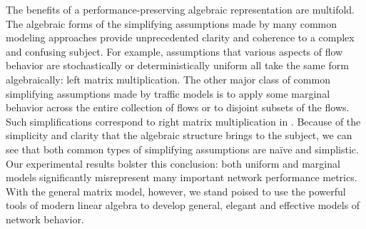 \documentclass[twocolumn,final]{svjour3}
\begin{document}
The benefits of a performance-preserving algebraic representation are multifold. The algebraic forms of the simplifying assumptions made by many common modeling approaches provide unprecedented clarity and coherence to a complex and confusing subject. For example, assumptions that various aspects of flow behavior are stochastically or deterministically uniform all take the same form algebraically: left matrix multiplication. The other major class of common simplifying assumptions made by traffic models is to apply some marginal behavior across the entire collection of flows or to disjoint subsets of the flows. Such simplifications correspond to right matrix multiplication in . Because of the simplicity and clarity that the algebraic structure brings to the subject, we can see that both common types of simplifying assumptions are na\"ive and simplistic. Our experimental results bolster this conclusion: both uniform and marginal models significantly misrepresent many important network performance metrics. With the general matrix model, however, we stand poised to use the powerful tools of modern linear algebra to develop general, elegant and effective models of network behavior.




\end{document}
